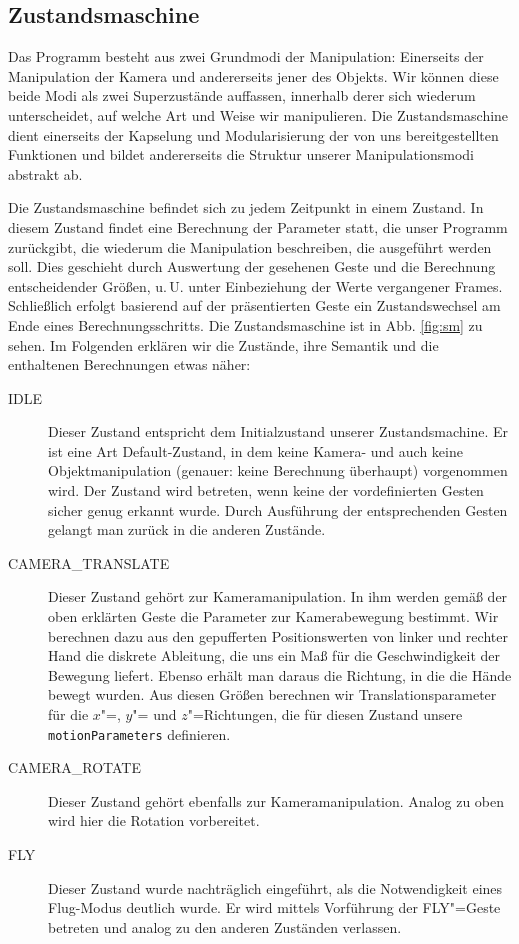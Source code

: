 \subsection{Zustandsmaschine}
	Das Programm besteht aus zwei Grundmodi der Manipulation: Einerseits der Manipulation der Kamera und andererseits jener des Objekts. Wir können diese beide Modi als zwei Superzustände auffassen, innerhalb derer sich wiederum unterscheidet, auf welche Art und Weise wir manipulieren. Die Zustandsmaschine dient einerseits der Kapselung und Modularisierung der von uns bereitgestellten Funktionen und bildet andererseits die Struktur unserer Manipulationsmodi abstrakt ab.\par 
	Die Zustandsmaschine befindet sich zu jedem Zeitpunkt in einem Zustand. In diesem Zustand findet eine Berechnung der Parameter statt, die unser Programm zurückgibt, die wiederum die Manipulation beschreiben, die ausgeführt werden soll. Dies geschieht durch Auswertung der gesehenen Geste und die Berechnung entscheidender Größen, u.\,U. unter Einbeziehung der Werte vergangener Frames. Schließlich erfolgt basierend auf der präsentierten Geste ein Zustandswechsel am Ende eines Berechnungsschritts. Die Zustandsmaschine ist in Abb. \ref{fig:sm} zu sehen. Im Folgenden erklären wir die Zustände, ihre Semantik und die enthaltenen Berechnungen etwas näher:
	\begin{description}
		\item[IDLE] Dieser Zustand entspricht dem Initialzustand unserer Zustandsmachine. Er ist eine Art Default-Zustand, in dem keine Kamera- und auch keine Objektmanipulation (genauer: keine Berechnung überhaupt) vorgenommen wird. Der Zustand wird betreten, wenn keine der vordefinierten Gesten sicher genug erkannt wurde. Durch Ausführung der entsprechenden Gesten gelangt man zurück in die anderen Zustände.
		\item[CAMERA\_TRANSLATE] Dieser Zustand gehört zur Kameramanipulation. In ihm werden gemäß der oben erklärten Geste die Parameter zur Kamerabewegung bestimmt. Wir berechnen dazu aus den gepufferten Positionswerten von linker und rechter Hand die diskrete Ableitung, die uns ein Maß für die Geschwindigkeit der Bewegung liefert. Ebenso erhält man daraus die Richtung, in die die Hände bewegt wurden. Aus diesen Größen berechnen wir Translationsparameter für die $x$"=, $y$"= und $z$"=Richtungen, die für diesen Zustand unsere \texttt{motionParameters} definieren. %
		\item[CAMERA\_ROTATE] Dieser Zustand gehört ebenfalls zur Kameramanipulation. Analog zu oben wird hier die Rotation vorbereitet. %
		\item[FLY] Dieser Zustand wurde nachträglich eingeführt, als die Notwendigkeit eines Flug-Modus deutlich wurde. Er wird mittels Vorführung der FLY"=Geste betreten und analog zu den anderen Zuständen verlassen. %
	\end{description}
